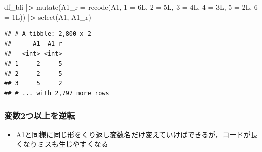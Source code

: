 \documentclass[
  xelatex,ja=standard, b5paper]{bxjsbook}
\newenvironment{Shaded}{\begin{snugshade}}{\end{snugshade}}
\newcommand{\AttributeTok}[1]{\textcolor[rgb]{0.77,0.63,0.00}{#1}}
\newcommand{\ErrorTok}[1]{\textcolor[rgb]{0.64,0.00,0.00}{\textbf{#1}}}
\newcommand{\FunctionTok}[1]{\textcolor[rgb]{0.00,0.00,0.00}{#1}}
\newcommand{\NormalTok}[1]{#1}
\newcommand{\OtherTok}[1]{\textcolor[rgb]{0.56,0.35,0.01}{#1}}
\newcommand{\SpecialCharTok}[1]{\textcolor[rgb]{0.00,0.00,0.00}{#1}}
\newcommand{\StringTok}[1]{\textcolor[rgb]{0.31,0.60,0.02}{#1}}
\providecommand{\tightlist}{%
  \setlength{\itemsep}{0pt}\setlength{\parskip}{0pt}}
\begin{document}
\begin{Shaded}
\begin{Highlighting}[]
\NormalTok{df\_bfi }\SpecialCharTok{|}\ErrorTok{\textgreater{}} 
  \FunctionTok{mutate}\NormalTok{(}\AttributeTok{A1\_r =} \FunctionTok{recode}\NormalTok{(A1, }\StringTok{\textasciigrave{}}\AttributeTok{1}\StringTok{\textasciigrave{}} \OtherTok{=}\NormalTok{ 6L, }\StringTok{\textasciigrave{}}\AttributeTok{2}\StringTok{\textasciigrave{}} \OtherTok{=}\NormalTok{ 5L, }\StringTok{\textasciigrave{}}\AttributeTok{3}\StringTok{\textasciigrave{}} \OtherTok{=}\NormalTok{ 4L,      }
                           \StringTok{\textasciigrave{}}\AttributeTok{4}\StringTok{\textasciigrave{}} \OtherTok{=}\NormalTok{ 3L, }\StringTok{\textasciigrave{}}\AttributeTok{5}\StringTok{\textasciigrave{}} \OtherTok{=}\NormalTok{ 2L, }\StringTok{\textasciigrave{}}\AttributeTok{6}\StringTok{\textasciigrave{}} \OtherTok{=}\NormalTok{ 1L)) }\SpecialCharTok{|}\ErrorTok{\textgreater{}} 
  \FunctionTok{select}\NormalTok{(A1, A1\_r)}
\end{Highlighting}
\end{Shaded}

\begin{verbatim}
## # A tibble: 2,800 x 2
##      A1  A1_r
##   <int> <int>
## 1     2     5
## 2     2     5
## 3     5     2
## # ... with 2,797 more rows
\end{verbatim}

\hypertarget{mu-rev-recode2}{%
\subsubsection{変数2つ以上を逆転}\label{mu-rev-recode2}}

\begin{itemize}
\tightlist
\item
  A1と同様に同じ形をくり返し変数名だけ変えていけばできるが，コードが長くなりミスも生じやすくなる
\end{itemize}
\end{document}
